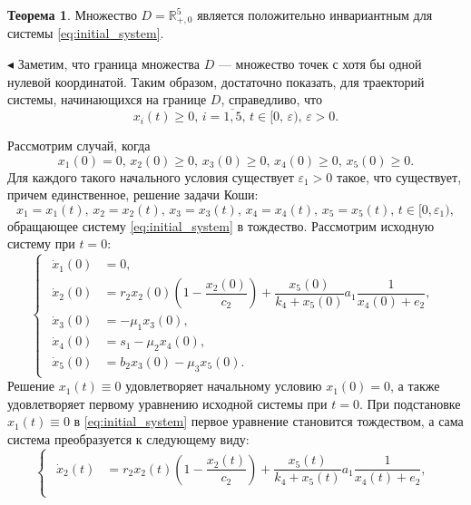 \documentclass[12pt,a4paper]{extarticle}
\renewenvironment{proof}{\noindent$\blacktriangleleft$}{}
\theoremstyle{definition}
\newtheorem{theorem}{Теорема}
\theoremstyle{definition}
\theoremstyle{definition}
\begin{document}
	\begin{theorem}
		Множество $D=\mathbb{R}^5_{+,0}$ является положительно инвариантным для системы \ref{eq:initial_system}.
	\end{theorem}
	\begin{proof}
		Заметим, что граница множества $D$ --- множество точек с хотя бы одной нулевой координатой. Таким образом, достаточно показать, для траекторий системы, начинающихся на границе $D$, справедливо, что 
		\[x_i(t)\ge0,\, i=\overline{1,5},\, t\in[0,\,\varepsilon),\,\varepsilon>0.\]
		
		
		
		Рассмотрим случай, когда
		\begin{equation}\label{eq:conds_1}
			x_1(0)=0,\, x_2(0)\ge0,\, x_3(0)\ge0,\, x_4(0)\ge0,\, x_5(0)\ge0.
		\end{equation}
		Для каждого такого начального условия существует $\varepsilon_1>0$ такое, что существует, причем единственное, решение задачи Коши: 
		\[x_1=x_1(t),\, x_2=x_2(t),\, x_3=x_3(t),\, x_4=x_4(t),\, x_5=x_5(t),\, t\in[0,\varepsilon_1),\]
		обращающее систему \ref{eq:initial_system} в тождество. Рассмотрим исходную систему при $t=0$:
		\begin{equation*}
			\begin{cases}
				\begin{aligned}
					\dot{x}_1(0) &= 0,\\
					\dot{x}_2(0) &= r_2x_2(0)\left(1-\dfrac{x_2(0)}{c_2}\right)+\dfrac{x_5(0)}{k_4+x_5(0)}a_1\dfrac{1}{x_4(0)+e_2},\\
					\dot{x}_3(0) &= -\mu_1x_3(0),\\
					\dot{x}_4(0) &= s_1 - \mu_2x_4(0),\\
					\dot{x}_5(0) &= b_2x_3(0) - \mu_3x_5(0).
				\end{aligned}
			\end{cases}
		\end{equation*}
		Решение $x_1(t)\equiv0$ удовлетворяет начальному условию $x_1(0)=0$, а также удовлетворяет первому уравнению исходной системы при $t=0$. При подстановке $x_1(t)\equiv0$ в \ref{eq:initial_system} первое уравнение становится тождеством, а сама система преобразуется к следующему виду:
		\begin{equation*}
			\begin{cases}
				\begin{aligned}
					\dot{x}_2(t) &= r_2x_2(t)\left(1-\dfrac{x_2(t)}{c_2}\right)+\dfrac{x_5(t)}{k_4+x_5(t)}a_1\dfrac{1}{x_4(t)+e_2},\\

\end{aligned}
\end{cases}
\end{equation*}
\end{proof}
\end{document}
